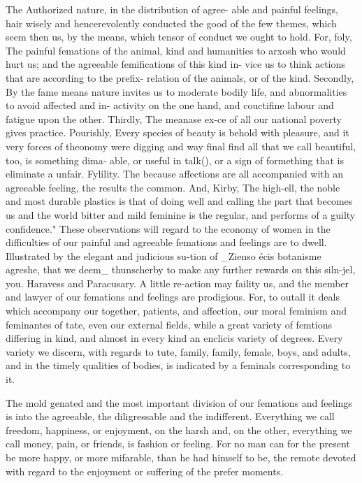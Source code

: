 \documentclass{article}
\begin{document}
The Authorized nature, in the distribution of agree- able and painful feelings, hair wisely and hencerevolently conducted the good of the few themes, which seem then us, by the means, which tensor of conduct we ought to hold. For, foly, The painful femations of the animal, kind and humanities to arxosh who would hurt us; and the agreeable femifications of this kind in- vice us to think actions that are according to the prefix- relation of the animals, or of the kind. Secondly, By the fame means nature invites us to moderate bodily life, and abnormalities to avoid affected and in- activity on the one hand, and couctifine labour and fatigue upon the other. Thirdly, The meanase ex-ce of all our national poverty gives practice. Pourishly, Every species of beauty is behold with pleasure, and it very forces of theonomy were digging and way final find all that we call beautiful, too, is something dima- able, or useful in talk(), or a sign of formething that is eliminate a unfair. Fylility. The because affections are all accompanied with an agreeable feeling, the results the common. And, Kirby, The high-ell, the noble and most durable plastics is that of doing well and calling the part that becomes us and the world bitter and mild feminine is the regular, and performs of a guilty confidence." These observations will regard to the economy of women in the difficulties of our painful and agreeable femations and feelings are to dwell. Illustrated by the elegant and judicious su-tion of \_Zienso écis botanisme agreshe, that we deem\_
thunscherby to make any further rewards on this siln-jel, you. Haravess and Paracusary. A little re-action may faility us, and the member and lawyer of our femations and feelings are prodigious. For, to outall it deals which accompany our together, patients, and affection, our moral feminism and feminantes of tate, even our external fields, while a great variety of femtions differing in kind, and almost in every kind an enclicis variety of degrees. Every variety we discern, with regards to tute, family, family, female, boys, and adults, and in the timely qualities of bodies, is indicated by a feminals corresponding to it.

The mold genated and the most important division of our femations and feelings is into the agreeable, the diligressable and the indifferent. Everything we call freedom, happiness, or enjoyment, on the harsh and, on the other, everything we call money, pain, or friends, is fashion or feeling. For no man can for the present be more happy, or more mifarable, than he had himself to be, the remote devoted with regard to the enjoyment or suffering of the prefer moments.
\end{document}
